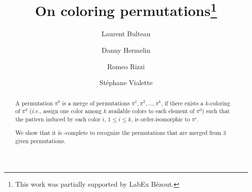\documentclass[a4paper,UKenglish,cleveref,autoref,thm-restate]{lipics-v2021}
\title{On coloring permutations\footnote{This work was partially supported by LabEx Bézout.}}
\author{Laurent Bulteau}{LIGM, Univ Gustave Eiffel, CNRS, 77454 Marne-la-Vallée, France}{laurent.bulteau@univ-eiffel.fr}{}{}
\author{Danny Hermelin}{Ben-Gurion University of the Negev, Israel}{hermelin@bgu.ac.il}{}{}
\author{Romeo Rizzi}{Computer Science Department, University of Verona, Verona, Italy}{romeo.rizzi@univr.it}{}{}
\author{Stéphane Vialette}{LIGM, Univ Gustave Eiffel, CNRS, 77454 Marne-la-Vallée, France}{stephane.vialette@univ-eiffel.fr}{}{}
\begin{document}

\maketitle

\begin{abstract}
  A permutation $\pi^0$ is a merge of permutations 
  $\pi^1, \pi^2, \dots, \pi^k$, 
  if there exists a $k$-coloring of $\pi^0$ (\emph{i.e.}, assign one color
  among $k$ available colors to each element of $\pi^0$) such that the
  pattern induced by each color $i$, $1 \leq i \leq k$, is order-isomorphic
  to $\pi^i$.

  We show that it is \NP-complete to recognize the permutations that are merged
  from $3$ given permutations.
\end{abstract}







%

%






%


\end{document}
